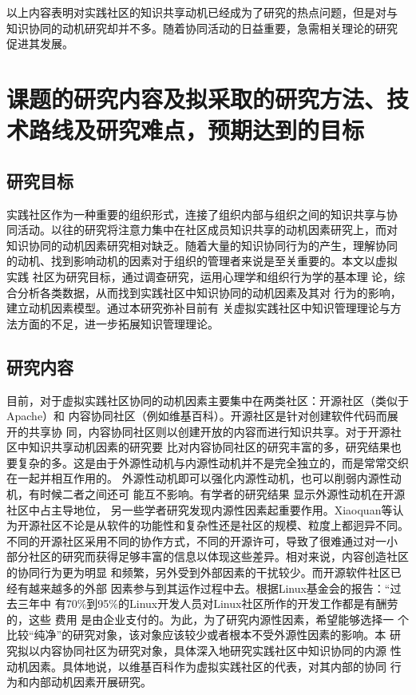 \documentclass[12pt,a4paper,cs4size]{ctexart}
\begin{document}
以上内容表明对实践社区的知识共享动机已经成为了研究的热点问题，但是对与
知识协同的动机研究却并不多。随着协同活动的日益重要，急需相关理论的研究
促进其发展。

\section{课题的研究内容及拟采取的研究方法、技术路线及研究难点，预期达到的目标}


\subsection{研究目标}
实践社区作为一种重要的组织形式，连接了组织内部与组织之间的知识共享与协
同活动。以往的研究将注意力集中在社区成员知识共享的动机因素研究上，而对
知识协同的动机因素研究相对缺乏。随着大量的知识协同行为的产生，理解协同
的动机、找到影响动机的因素对于组织的管理者来说是至关重要的。本文以虚拟
实践
社区为研究目标，通过调查研究，运用心理学和组织行为学的基本理
论，综合分析各类数据，从而找到实践社区中知识协同的动机因素及其对
行为的影响，建立动机因素模型。通过本研究弥补目前有
关虚拟实践社区中知识管理理论与方法方面的不足，进一步拓展知识管理理论。

\subsection{研究内容}

目前，对于虚拟实践社区协同的动机因素主要集中在两类社区：开源社区（类似于Apache）和
内容协同社区（例如维基百科）。开源社区是针对创建软件代码而展开的共享协
同，内容协同社区则以创建开放的内容而进行知识共享。对于开源社区中知识共享动机因素的研究要
比对内容协同社区的研究丰富的多，研究结果也要复杂的多。这是由于外源性动机与内源性动机并不是完全独立的，而是常常交织在一起并相互作用的。
外源性动机即可以强化内源性动机，也可以削弱内源性动机，有时候二者之间还可
能互不影响\cite{deci1971eem}。有学者的研究结果
显示外源性动机在开源社区中占主导地位\cite{10.1109/HICSS.2001.927045}，
另一些学者研究发现内源性因素起重要作用\cite{Lakhani2003}。Xiaoquan等认
为开源社区不论是从软件的功能性和复杂性还是社区的规模、粒度上都迥异不同。
不同的开源社区采用不同的协作方式，不同的开源许可，导致了很难通过对一小
部分社区的研究而获得足够丰富的信息以体现这些差异\cite{Zhang2006}。相对来说，内容创造社区的协同行为更为明显
和频繁，另外受到外部因素的干扰较少。而开源软件社区已经有越来越多的外部
因素参与到其运作过程中去。根据Linux基金会的报告：“过去三年中
有70\%到95\%的Linux开发人员对Linux社区所作的开发工作都是有酬劳的，这些
费用 是由企业支付的\cite{linux}。为此，为了研究内源性因素，希望能够选择一
个比较“纯净”的研究对象，该对象应该较少或者根本不受外源性因素的影响。本
研究拟以内容协同社区为研究对象，具体深入地研究实践社区中知识协同的内源
性动机因素。具体地说，以维基百科作为虚拟实践社区的代表，对其内部的协同
行为和内部动机因素开展研究。
\end{document}
